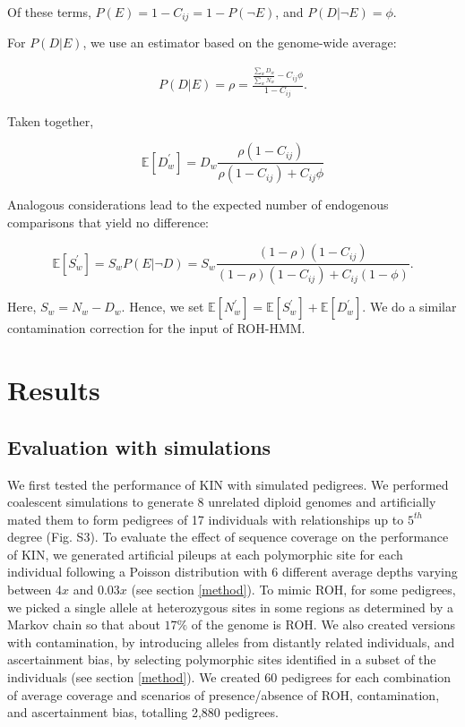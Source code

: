 \documentclass[12pt, letterpaper]{article}
\begin{document}
Of these terms, $P(E)= 1 -C_{ij} = 1 - P(\neg E)$, and $P(D| \neg E) = \phi$.

For $P(D|E)$, we use an estimator based on the genome-wide average: 

\begin{align}
    P(D|E) = \rho = \frac{\frac{\sum_w D_w}{\sum_w N_w} - C_{ij} \phi}{1 - C_{ij}}.
\end{align}

Taken together, 

\begin{equation}
 \mathbb{E}[D_w^{'}]= D_{w}\frac{\rho (1-C_{ij})}{\rho(1-C_{ij}) + C_{ij}\phi}
 \end{equation}
 
 Analogous considerations lead to the expected number of endogenous comparisons that yield no difference:
 
 \begin{equation}
\mathbb{E}[S_w^{'}] = S_{w} P(E| \neg D) = S_{w} \frac{(1-\rho)(1-C_{ij})}{(1-\rho)(1-C_{ij}) + C_{ij}(1-\phi)}.
 \end{equation}

Here, $S_w = N_w - D_w$. Hence, we set $\mathbb{E}[N_w^{'}] = \mathbb{E}[S_w^{'}] + \mathbb{E}[D_w^{'}]$. We do a similar contamination correction for the input of ROH-HMM.




\section{Results}\label{results}

\subsection{Evaluation with simulations}
We first tested the performance of KIN with simulated pedigrees. We performed coalescent simulations to generate 8 unrelated diploid genomes and artificially mated them to form pedigrees of 17 individuals with relationships up to $5^{th}$ degree (Fig. S3). To evaluate the effect of sequence coverage on the performance of KIN, we generated artificial pileups at each polymorphic site for each individual following a Poisson distribution with 6 different average depths varying between 4$x$ and 0.03$x$ (see section \ref{method}). To mimic ROH, for some pedigrees, we picked a single allele at heterozygous sites in some regions as determined by a Markov chain so that about $17\%$ of the genome is ROH. We also created versions with contamination, by introducing alleles from distantly related individuals, and ascertainment bias, by selecting polymorphic sites identified in a subset of the individuals (see section \ref{method}). We created 60 pedigrees for each combination of average coverage and scenarios of presence/absence of ROH, contamination, and ascertainment bias, totalling 2,880 pedigrees.
\end{document}
